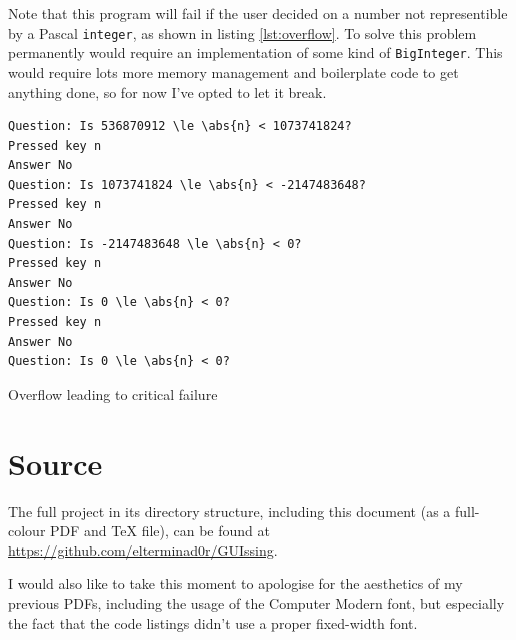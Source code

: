 \documentclass[a4paper,11pt]{article}
\newenvironment{longlisting}
{\addvspace{\baselineskip}\captionsetup{type=listing}}
{\addvspace{\baselineskip}}
\begin{document}
    Note that this program will fail if the user decided on a number not
    representible by a Pascal \texttt{integer}, as shown in listing
    \ref{lst:overflow}. To solve this problem permanently would require an
    implementation of some kind of \texttt{BigInteger}. This would require lots
    more memory management and boilerplate code to get anything done, so for now
    I've opted to let it break.

\begin{longlisting}
\begin{verbatim}
Question: Is 536870912 \le \abs{n} < 1073741824?
Pressed key n
Answer No
Question: Is 1073741824 \le \abs{n} < -2147483648?
Pressed key n
Answer No
Question: Is -2147483648 \le \abs{n} < 0?
Pressed key n
Answer No
Question: Is 0 \le \abs{n} < 0?
Pressed key n
Answer No
Question: Is 0 \le \abs{n} < 0?
\end{verbatim}
\caption{Overflow leading to critical failure}\label{lst:overflow}
\end{longlisting}

    \section{Source}

    The full project in its directory structure, including this document (as a
    full-colour PDF and \TeX{} file), can be found at
    \url{https://github.com/elterminad0r/GUIssing}.

    I would also like to take this moment to apologise for the aesthetics of my
    previous PDFs, including the usage of the Computer Modern font, but
    especially the fact that the code listings didn't use a proper fixed-width
    font.
\end{document}
